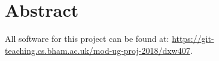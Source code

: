 \section{Abstract}


All software for this project can be found at: \newline \url{https://git-teaching.cs.bham.ac.uk/mod-ug-proj-2018/dxw407}.